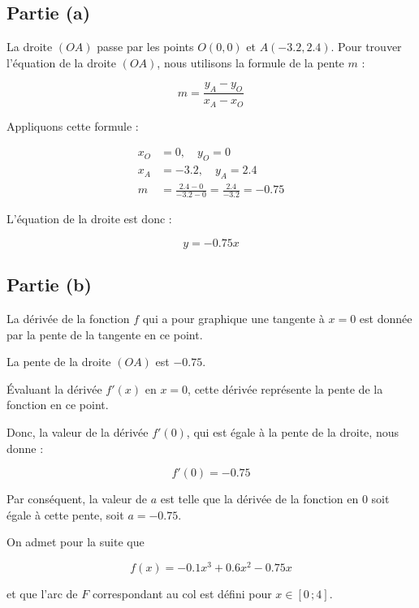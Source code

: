 \documentclass[answers]{exam}
\begin{document}
\begin{questions}
\begin{solution}

\subsection*{Partie (a)}

La droite $(OA)$ passe par les points $O(0, 0)$ et $A(-3.2, 2.4)$. Pour trouver l'équation de la droite $(OA)$, nous utilisons la formule de la pente $m$ :

\[
m = \frac{y_A - y_O}{x_A - x_O}
\]

Appliquons cette formule :

\begin{align*}
x_O &= 0, \quad y_O = 0 \\
x_A &= -3.2, \quad y_A = 2.4 \\
m &= \frac{2.4 - 0}{-3.2 - 0} = \frac{2.4}{-3.2} = -0.75
\end{align*}

L'équation de la droite est donc :

\[
y = -0.75x
\]

\subsection*{Partie (b)}

La dérivée de la fonction $f$ qui a pour graphique une tangente à $x = 0$ est donnée par la pente de la tangente en ce point.

\begin{compactitem}
\item La pente de la droite $(OA)$ est $-0.75$.
\item Évaluant la dérivée $f'(x)$ en $x = 0$, cette dérivée représente la pente de la fonction en ce point.
\end{compactitem}

Donc, la valeur de la dérivée $f'(0)$, qui est égale à la pente de la droite, nous donne :

\[ f'(0) = -0.75 \]

Par conséquent, la valeur de $a$ est telle que la dérivée de la fonction en 0 soit égale à cette pente, soit $a = -0.75$.

\end{solution}

\question[5.5] On admet pour la suite que
  
  \[
  f(x) = -0.1x^{3} + 0.6x^{2} - 0.75x
  \]
  
  et que l’arc de $F$ correspondant au col est défini pour $x \in [0\,;4]$.
  

\end{questions}
\end{document}
